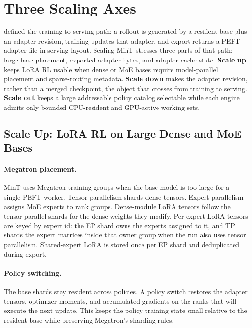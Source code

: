 \section{Three Scaling Axes}
\label{sec:scaling}

 defined the training-to-serving path: a rollout is generated by a resident base plus an adapter revision, training updates that adapter, and export returns a PEFT adapter file in serving layout. Scaling MinT stresses three parts of that path: large-base placement, exported adapter bytes, and adapter cache state. \textbf{Scale up} keeps LoRA RL usable when dense or MoE bases require model-parallel placement and sparse-routing metadata. \textbf{Scale down} makes the adapter revision, rather than a merged checkpoint, the object that crosses from training to serving. \textbf{Scale out} keeps a large addressable policy catalog selectable while each engine admits only bounded CPU-resident and GPU-active working sets.

\subsection{Scale Up: LoRA RL on Large Dense and MoE Bases}

\paragraph{Megatron placement.}
MinT uses Megatron training groups when the base model is too large for a single PEFT worker. Tensor parallelism shards dense tensors. Expert parallelism assigns MoE experts to rank groups. Dense-module LoRA tensors follow the tensor-parallel shards for the dense weights they modify. Per-expert LoRA tensors are keyed by expert id: the EP shard owns the experts assigned to it, and TP shards the expert matrices inside that owner group when the run also uses tensor parallelism. Shared-expert LoRA is stored once per EP shard and deduplicated during export.

\paragraph{Policy switching.}
The base shards stay resident across policies. A policy switch restores the adapter tensors, optimizer moments, and accumulated gradients on the ranks that will execute the next update. This keeps the policy training state small relative to the resident base while preserving Megatron's sharding rules.

